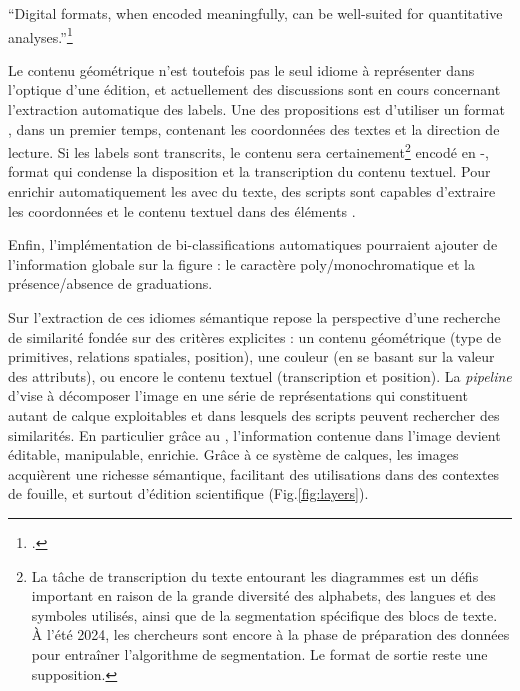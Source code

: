 \begin{kwote}                            
``Digital formats, when encoded meaningfully, can be well-suited for
quantitative analyses.''\footcite[p.82]{roughan_digital_2014}
\end{kwote}  

Le contenu géométrique n'est toutefois pas le seul idiome à représenter
dans l'optique d'une édition, et actuellement des discussions sont en
cours concernant l'extraction automatique des labels. Une des
propositions est d'utiliser un format \json, dans un premier temps,
contenant les coordonnées des textes et la direction de lecture. Si les
labels sont transcrits, le contenu sera certainement\footnote{La tâche
  de transcription du texte entourant les diagrammes est un défis
  important en raison de la grande diversité des alphabets, des langues
  et des symboles utilisés, ainsi que de la segmentation spécifique des
  blocs de texte. À l'été 2024, les chercheurs sont encore à la phase de
  préparation des données pour entraîner l'algorithme de segmentation.
 Le format de sortie reste une supposition.} encodé en \xml-\alto,
format qui condense la disposition et la transcription du contenu
textuel. Pour enrichir automatiquement les \svgs avec du texte, des
scripts sont capables d'extraire les coordonnées et le contenu textuel
dans des éléments \svg.

Enfin, l'implémentation de bi-classifications automatiques pourraient
ajouter de l'information globale sur la figure : le caractère
poly/monochromatique et la présence/absence de graduations.

Sur l'extraction de ces idiomes sémantique repose la perspective d'une
recherche de similarité fondée sur des critères explicites : un contenu
géométrique (type de primitives, relations spatiales, position), une
couleur (en se basant sur la valeur des attributs), ou encore le contenu
textuel (transcription et position). La \textit{pipeline} d'\eida vise à
décomposer l'image en une série de représentations qui constituent
autant de calque exploitables et dans lesquels des scripts peuvent
rechercher des similarités. En particulier grâce au \svg, l'information
contenue dans l'image devient éditable, manipulable, enrichie. Grâce à
ce système de calques, les images acquièrent une richesse sémantique,
facilitant des utilisations dans des contextes de fouille, et surtout
d'édition scientifique (Fig.\ref{fig:layers}).

